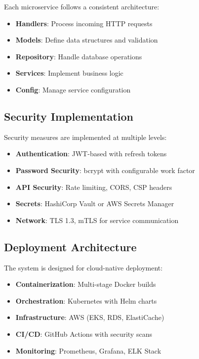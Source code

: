 Each microservice follows a consistent architecture:

\begin{itemize}
    \item \textbf{Handlers}: Process incoming HTTP requests
    \item \textbf{Models}: Define data structures and validation
    \item \textbf{Repository}: Handle database operations
    \item \textbf{Services}: Implement business logic
    \item \textbf{Config}: Manage service configuration
\end{itemize}

\subsection{Security Implementation}

Security measures are implemented at multiple levels:

\begin{itemize}
    \item \textbf{Authentication}: JWT-based with refresh tokens
    \item \textbf{Password Security}: bcrypt with configurable work factor
    \item \textbf{API Security}: Rate limiting, CORS, CSP headers
    \item \textbf{Secrets}: HashiCorp Vault or AWS Secrets Manager
    \item \textbf{Network}: TLS 1.3, mTLS for service communication
\end{itemize}

\subsection{Deployment Architecture}

The system is designed for cloud-native deployment:

\begin{itemize}
    \item \textbf{Containerization}: Multi-stage Docker builds
    \item \textbf{Orchestration}: Kubernetes with Helm charts
    \item \textbf{Infrastructure}: AWS (EKS, RDS, ElastiCache)
    \item \textbf{CI/CD}: GitHub Actions with security scans
    \item \textbf{Monitoring}: Prometheus, Grafana, ELK Stack
\end{itemize}

